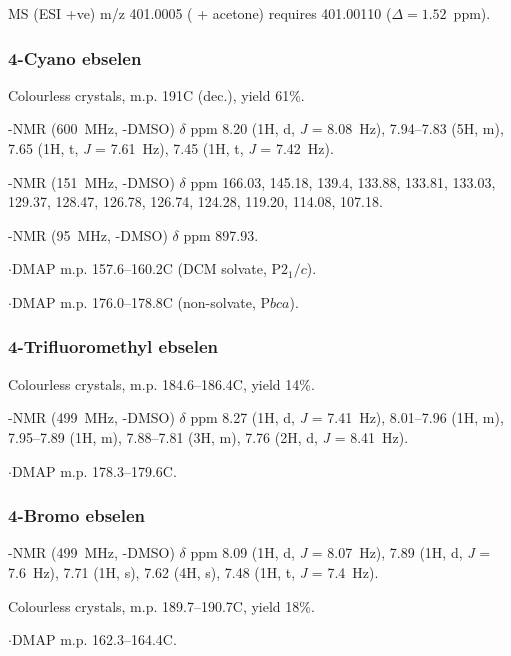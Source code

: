 \begin{refsection}
MS (ESI +ve) m/z 401.0005 ( + acetone)  requires 401.00110 ($ \Delta =1.52$~ppm).

\subsubsection{4-Cyano ebselen }
Colourless crystals, m.p. 191\degree{}C (dec.), yield 61\%.

-NMR (600~MHz, -DMSO) $ \delta $ ppm 8.20 (1H, d, \textit{J} = 8.08~Hz), 7.94--7.83 (5H, m), 7.65 (1H, t, \textit{J} = 7.61~Hz), 7.45 (1H, t, \textit{J} = 7.42~Hz).

-NMR (151~MHz, -DMSO) $ \delta $ ppm 166.03, 145.18, 139.4, 133.88, 133.81, 133.03, 129.37, 128.47, 126.78, 126.74, 124.28, 119.20, 114.08, 107.18.

-NMR (95~MHz, -DMSO) $ \delta $ ppm 897.93.

$ \cdot $DMAP m.p. 157.6--160.2\degree{}C (DCM solvate, P$2_1/c$).

$ \cdot $DMAP m.p. 176.0--178.8\degree{}C (non-solvate, P$bca$).


\subsubsection{4-Trifluoromethyl ebselen }
Colourless crystals, m.p. 184.6--186.4\degree{}C, yield 14\%.

-NMR (499~MHz, -DMSO) $ \delta $ ppm 8.27 (1H, d, \textit{J} = 7.41~Hz), 8.01--7.96 (1H, m), 7.95--7.89 (1H, m), 7.88--7.81 (3H, m), 7.76 (2H, d, \textit{J} = 8.41~Hz).

$ \cdot $DMAP m.p. 178.3--179.6\degree{}C.


\subsubsection{4-Bromo ebselen } 

-NMR (499~MHz, -DMSO) $ \delta $ ppm 8.09 (1H, d, \textit{J} = 8.07~Hz), 7.89 (1H, d, \textit{J} = 7.6~Hz), 7.71 (1H, s), 7.62 (4H, s), 7.48 (1H, t, \textit{J} = 7.4~Hz).

Colourless crystals, m.p. 189.7--190.7\degree{}C, yield 18\%.

$ \cdot $DMAP m.p. 162.3--164.4\degree{}C.



\end{refsection}
